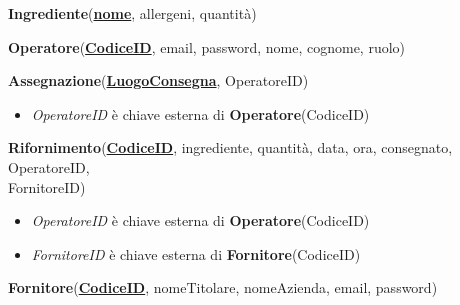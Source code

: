 \documentclass[12pt,a4paper]{article}
\begin{document}
    \begin{tcolorbox}[
        colback=gray!8,
        colframe=black!30,
        title=
    ]
        \textbf{Ingrediente}(\textbf{\uline{nome}}, allergeni, quantità)
    \end{tcolorbox}

    \begin{tcolorbox}[
        colback=gray!8,
        colframe=black!30,
        title=
    ]
        \textbf{Operatore}(\textbf{\uline{CodiceID}}, email, password, nome, cognome, ruolo)
    \end{tcolorbox}

    \begin{tcolorbox}[
        colback=gray!8,
        colframe=black!30,
        title=
    ]
        \textbf{Assegnazione}(\textbf{\uline{LuogoConsegna}}, OperatoreID)
        \begin{itemize}[leftmargin=1em]
            \item \textit{OperatoreID} è chiave esterna di \textbf{Operatore}(CodiceID)
        \end{itemize}
    \end{tcolorbox}

    \begin{tcolorbox}[
        colback=gray!8,
        colframe=black!30,
        title=
    ]
        \textbf{Rifornimento}(\textbf{\uline{CodiceID}}, ingrediente, quantità, data, ora, consegnato, OperatoreID, \\FornitoreID)
        \begin{itemize}[leftmargin=1em]
            \item \textit{OperatoreID} è chiave esterna di \textbf{Operatore}(CodiceID)
            \item \textit{FornitoreID} è chiave esterna di \textbf{Fornitore}(CodiceID)
        \end{itemize}
    \end{tcolorbox}

    \begin{tcolorbox}[
        colback=gray!8,
        colframe=black!30,
        title=
    ]
        \textbf{Fornitore}(\textbf{\uline{CodiceID}}, nomeTitolare, nomeAzienda, email, password) 
    \end{tcolorbox}
    
\end{document}
